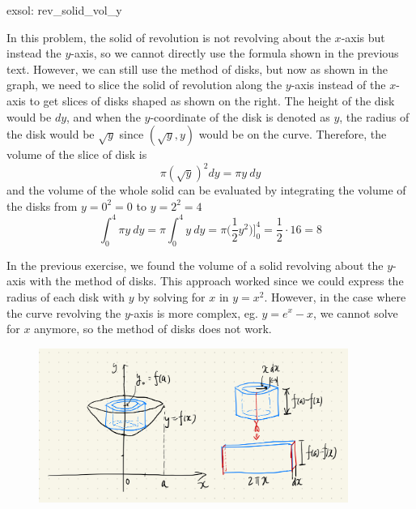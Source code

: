 \begin{exsol}[]{exsol: rev_solid_vol_y}
    \begin{center}
    \end{center}
    In this problem, the solid of revolution is not revolving about the $x$-axis but instead the $y$-axis, so we cannot directly use the formula shown in the previous text.  However, we can still use the method of disks, but now as shown in the graph, we need to slice the solid of revolution along the $y$-axis instead of the $x$-axis to get slices of disks shaped as shown on the right.  The height of the disk would be $dy$, and when the $y$-coordinate of the disk is denoted as $y$, the radius of the disk would be $\sqrt{y}$ since $(\sqrt{y}, y)$ would be on the curve.  Therefore, the volume of the slice of disk is
    \[\pi (\sqrt{y})^2 dy = \pi y~dy\]
    and the volume of the whole solid can be evaluated by integrating the volume of the disks from $y = 0^2 = 0$ to $y = 2^2 = 4$
    \[\int_0^4 \pi y~dy = \pi \int_0^4 y~dy = \pi \Big(\frac{1}{2}y^2\Big)\Big]_0^4 = \frac{1}{2}\cdot 16 = 8\]
\end{exsol}

In the previous exercise, we found the volume of a solid revolving about the $y$-axis with the method of disks.  This approach worked since we could express the radius of each disk with $y$ by solving for $x$ in $y = x^2$.  However, in the case where the curve revolving the $y$-axis is more complex, eg. $y =  e^x - x$, we cannot solve for $x$ anymore, so the method of disks does not work.

\begin{figure}[ht]
    \centering
    \includegraphics[width = 0.9\textwidth]{figures/chap 07/method_of_shells.png}
\end{figure}

